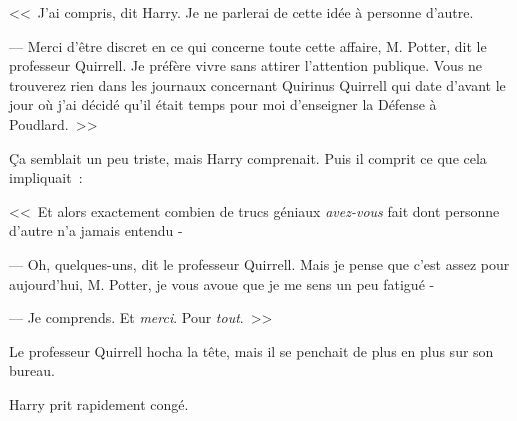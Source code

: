 <<~J'ai compris, dit Harry. Je ne parlerai de cette idée à personne d'autre.

--- Merci d'être discret en ce qui concerne toute cette affaire, M. Potter, dit le professeur Quirrell. Je préfère vivre sans attirer l'attention publique. Vous ne trouverez rien dans les journaux concernant Quirinus Quirrell qui date d'avant le jour où j'ai décidé qu'il était temps pour moi d'enseigner la Défense à Poudlard.~>>

Ça semblait un peu triste, mais Harry comprenait. Puis il comprit ce que cela impliquait~:

<<~Et alors exactement combien de trucs géniaux \emph{avez-vous} fait dont personne d'autre n'a jamais entendu -

--- Oh, quelques-uns, dit le professeur Quirrell. Mais je pense que c'est assez pour aujourd'hui, M. Potter, je vous avoue que je me sens un peu fatigué -

--- Je comprends. Et \emph{merci}. Pour \emph{tout}.~>>

Le professeur Quirrell hocha la tête, mais il se penchait de plus en plus sur son bureau.

Harry prit rapidement congé.~ 

